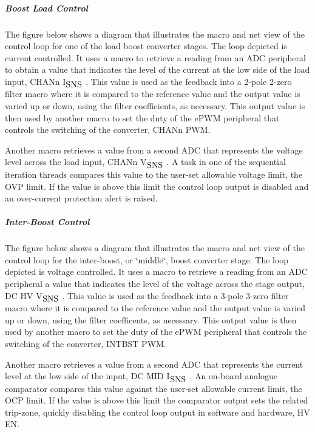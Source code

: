 \subparagraph*{Boost Load Control}

The figure below shows a diagram that illustrates the macro and net view of the control loop for one of the load boost converter stages. The loop depicted is current controlled. It uses a macro to retrieve a reading from an A\-D\-C peripheral to obtain a value that indicates the level of the current at the low side of the load input, C\-H\-A\-Nn I$_{\mbox{S\-N\-S}}$ . This value is used as the feedback into a 2-\/pole 2-\/zero filter macro where it is compared to the reference value and the output value is varied up or down, using the filter coefficients, as necessary. This output value is then used by another macro to set the duty of the e\-P\-W\-M peripheral that controls the switching of the converter, C\-H\-A\-Nn P\-W\-M.

Another macro retrieves a value from a second A\-D\-C that represents the voltage level across the load input, C\-H\-A\-Nn V$_{\mbox{S\-N\-S}}$ . A task in one of the sequential iteration threads compares this value to the user-\/set allowable voltage limit, the O\-V\-P limit. If the value is above this limit the control loop output is disabled and an over-\/current protection alert is raised.



\subparagraph*{Inter-\/\-Boost Control}

The figure below shows a diagram that illustrates the macro and net view of the control loop for the inter-\/boost, or \char`\"{}middle\char`\"{}, boost converter stage. The loop depicted is voltage controlled. It uses a macro to retrieve a reading from an A\-D\-C peripheral a value that indicates the level of the voltage across the stage output, D\-C H\-V V$_{\mbox{S\-N\-S}}$ . This value is used as the feedback into a 3-\/pole 3-\/zero filter macro where it is compared to the reference value and the output value is varied up or down, using the filter coefficents, as necessary. This output value is then used by another macro to set the duty of the e\-P\-W\-M peripheral that controls the switching of the converter, I\-N\-T\-B\-S\-T P\-W\-M.

Another macro retrieves a value from a second A\-D\-C that represents the current level at the low side of the input, D\-C M\-I\-D I$_{\mbox{S\-N\-S}}$ . An on-\/board analogue comparator compares this value against the user-\/set allowable current limit, the O\-C\-P limit. If the value is above this limit the comparator output sets the related trip-\/zone, quickly disabling the control loop output in software and hardware, H\-V E\-N.

 